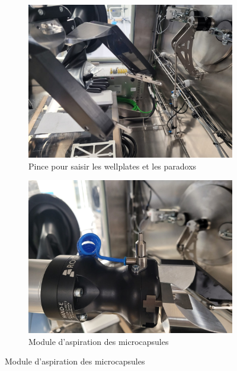 \begin{figure}[H]
    \vspace{0.5cm}
    
    \begin{subfigure}{0.45\textwidth}
        \includegraphics[width=\linewidth]{assets/figures/pince.jpeg}
        \caption{Pince pour saisir les \glspl{wellplate} et les \glspl{paradox}}
        \label{img:pince}
    \end{subfigure}
    \hspace{1cm}
    \begin{subfigure}{0.45\textwidth}
        \includegraphics[width=\linewidth]{assets/figures/module_aspiration.jpeg}
        \caption{Module d'aspiration des \glspl{microcapsule}}
        \label{img:module_aspiration}
    \end{subfigure}
    \vfill
\end{figure}
